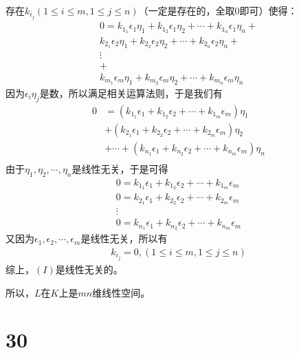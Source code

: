 \documentclass{article}
\begin{document}
存在$k_{i_j} (1 \leq i \leq m, 1 \leq j \leq n)$（一定是存在的，全取0即可）使得：
\begin{align*}
  0 =
  k_{1_1} \epsilon_1 \eta_1 + k_{1_2} \epsilon_1 \eta_2 + \cdots + k_{1_n} \epsilon_1 \eta_n + \\
  k_{2_1} \epsilon_2 \eta_1 + k_{2_2} \epsilon_2 \eta_2 + \cdots + k_{2_n} \epsilon_2 \eta_n + \\
  \vdots                                                                                       \\
  +                                                                                            \\
  k_{m_1} \epsilon_m \eta_1 + k_{m_2} \epsilon_m \eta_2 + \cdots + k_{m_n} \epsilon_m \eta_n
\end{align*}
因为$\epsilon_i \eta_j$是数，所以满足相关运算法则，于是我们有
\begin{align*}
  0 & = (k_{1_1} \epsilon_1 + k_{1_2} \epsilon_2 + \cdots + k_{1_m} \epsilon_m)\eta_1          \\
    & + (k_{2_1} \epsilon_1 + k_{2_2} \epsilon_2 + \cdots + k_{2_m} \epsilon_m)\eta_2          \\
    & + \cdots + (k_{n_1} \epsilon_1 + k_{n_2} \epsilon_2 + \cdots + k_{n_m} \epsilon_m)\eta_n \\
\end{align*}
由于$\eta_1, \eta_2, \cdots, \eta_n$是线性无关，于是可得
\begin{align*}
  0 = k_{1_1} \epsilon_1 + k_{1_2} \epsilon_2 + \cdots + k_{1_m} \epsilon_m \\
  0 = k_{2_1} \epsilon_1 + k_{2_2} \epsilon_2 + \cdots + k_{2_m} \epsilon_m \\
  \vdots                                                                    \\
  0 = k_{n_1} \epsilon_1 + k_{n_2} \epsilon_2 + \cdots + k_{n_m} \epsilon_m
\end{align*}
又因为$\epsilon_1, \epsilon_2, \cdots, \epsilon_m$是线性无关，所以有
\begin{align*}
  k_{i_j} = 0, (1 \leq i \leq m, 1 \leq j \leq n)
\end{align*}
综上，$(I)$是线性无关的。

所以，$L$在$K$上是$mn$维线性空间。

\section*{30}
\end{document}
